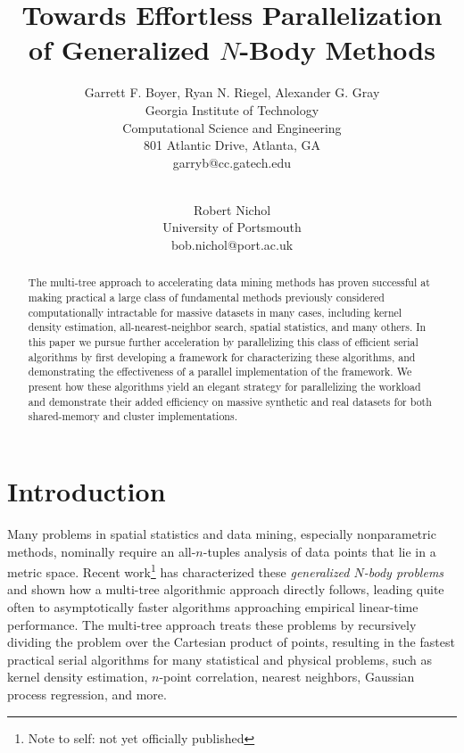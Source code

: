 \documentclass[times, leqno,twocolumn]{article}
\newcommand{\authornote}[1]{\footnote{Note to self: #1}}
\newcommand{\authorsnote}[1]{\authornote{#1}}
\begin{document}
\title{Towards Effortless Parallelization of Generalized $N$-Body Methods}

\author{Garrett F. Boyer, Ryan N. Riegel, Alexander G. Gray
\\ Georgia Institute of Technology
\\ Computational Science and Engineering
\\ 801 Atlantic Drive, Atlanta, GA
\\ garryb@cc.gatech.edu
\\
\and
\\ Robert Nichol
\\ University of Portsmouth
\\ bob.nichol@port.ac.uk
}

\maketitle
\thispagestyle{empty}

\begin{abstract}
The multi-tree approach to accelerating data mining methods has proven successful at making practical a large class of fundamental methods previously considered computationally intractable for massive datasets in many cases, including kernel density estimation, all-nearest-neighbor search, spatial statistics, and many others.
In this paper we pursue further acceleration by parallelizing this class of efficient serial algorithms by first developing a framework for characterizing these algorithms, and demonstrating the effectiveness of a parallel implementation of the framework.
We present how these algorithms yield an elegant strategy for parallelizing the workload and demonstrate their added efficiency on massive synthetic and real datasets for both shared-memory and cluster implementations.
\end{abstract}

\section{Introduction}

Many problems in spatial statistics and data mining, especially nonparametric methods, nominally require an all-$n$-tuples analysis of data points that lie in a metric space.
Recent work\authorsnote{not yet officially published}\cite{ryan_nips} has characterized these {\it generalized $N$-body problems} and shown how a multi-tree algorithmic approach directly follows, leading quite often to asymptotically faster algorithms approaching empirical linear-time performance.
The multi-tree approach treats these problems by recursively dividing the problem over the Cartesian product of points, resulting in the fastest practical serial algorithms for many statistical and physical problems, such as kernel density estimation, $n$-point correlation, nearest neighbors, Gaussian process regression, and more.
\end{document}
